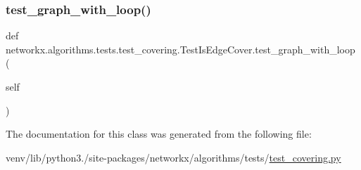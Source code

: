 \subsubsection{\texorpdfstring{test\+\_\+graph\+\_\+with\+\_\+loop()}{test\_graph\_with\_loop()}}
{\footnotesize\ttfamily def networkx.\+algorithms.\+tests.\+test\+\_\+covering.\+Test\+Is\+Edge\+Cover.\+test\+\_\+graph\+\_\+with\+\_\+loop (\begin{DoxyParamCaption}\item[{}]{self }\end{DoxyParamCaption})}



The documentation for this class was generated from the following file\+:\begin{DoxyCompactItemize}
\item 
venv/lib/python3./site-\/packages/networkx/algorithms/tests/\hyperlink{tests_2test__covering_8py}{test\+\_\+covering.\+py}\end{DoxyCompactItemize}
